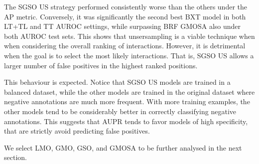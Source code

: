 The SGSO US strategy performed consistently worse than the others under the AP metric. Conversely, it was significantly the second best BXT model in both LT+TL and TT AUROC settings, while surpassing BRF GMOSA also under both AUROC test sets.
This shows that unsersampling is a viable technique when when considering the overall ranking of interactions. However, it is detrimental when the goal is to select the most likely interactions. That is, SGSO US allows a larger number of false positives in the highest ranked positions.

This behaviour is expected. Notice that SGSO US models are trained in a balanced dataset, while the other models are trained in the original dataset where negative annotations are much more frequent. With more training examples, the other models tend to be considerably better in correctly classifying negative annotations. This suggests that AUPR tends to favor models of high specificity, that are strictly avoid predicting false positives.


We select LMO, GMO, GSO, and GMOSA to be further analysed in the next section.




